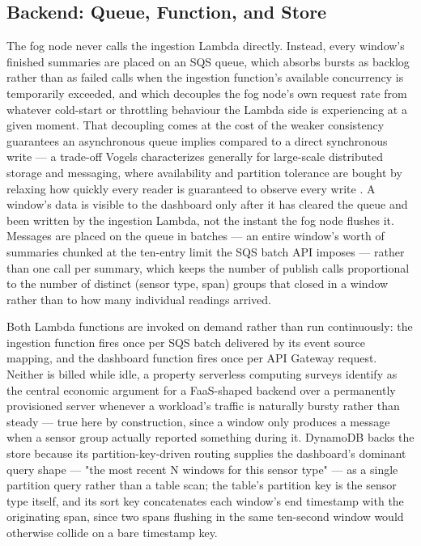 \documentclass[conference]{IEEEtran}
\begin{document}
\subsection{Backend: Queue, Function, and Store}

The fog node never calls the ingestion Lambda directly. Instead, every window's finished summaries are placed on an SQS queue, which absorbs bursts as backlog rather than as failed calls when the ingestion function's available concurrency is temporarily exceeded, and which decouples the fog node's own request rate from whatever cold-start or throttling behaviour the Lambda side is experiencing at a given moment. That decoupling comes at the cost of the weaker consistency guarantees an asynchronous queue implies compared to a direct synchronous write --- a trade-off Vogels characterizes generally for large-scale distributed storage and messaging, where availability and partition tolerance are bought by relaxing how quickly every reader is guaranteed to observe every write \cite{ref7}. A window's data is visible to the dashboard only after it has cleared the queue and been written by the ingestion Lambda, not the instant the fog node flushes it. Messages are placed on the queue in batches --- an entire window's worth of summaries chunked at the ten-entry limit the SQS batch API imposes --- rather than one call per summary, which keeps the number of publish calls proportional to the number of distinct (sensor type, span) groups that closed in a window rather than to how many individual readings arrived.

Both Lambda functions are invoked on demand rather than run continuously: the ingestion function fires once per SQS batch delivered by its event source mapping, and the dashboard function fires once per API Gateway request. Neither is billed while idle, a property serverless computing surveys identify as the central economic argument for a FaaS-shaped backend over a permanently provisioned server whenever a workload's traffic is naturally bursty rather than steady \cite{ref8} --- true here by construction, since a window only produces a message when a sensor group actually reported something during it. DynamoDB backs the store because its partition-key-driven routing supplies the dashboard's dominant query shape --- "the most recent N windows for this sensor type" --- as a single partition query rather than a table scan; the table's partition key is the sensor type itself, and its sort key concatenates each window's end timestamp with the originating span, since two spans flushing in the same ten-second window would otherwise collide on a bare timestamp key.
\end{document}
